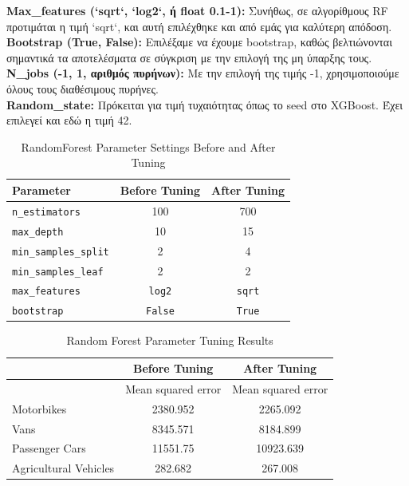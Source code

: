 \documentclass{llncs}
\begin{document}
\noindent \textbf{Max\_features (`sqrt`, `log2`, ή float 0.1-1):}
Συνήθως, σε αλγορίθμους RF προτιμάται η τιμή `sqrt`, και αυτή επιλέχθηκε και από εμάς για καλύτερη απόδοση. \\

\noindent \textbf{Bootstrap (True, False):}
Επιλέξαμε να έχουμε bootstrap, καθώς βελτιώνονται σημαντικά τα αποτελέσματα σε σύγκριση με την επιλογή της μη ύπαρξης τους.\\

\noindent \textbf{N\_jobs (-1, 1, αριθμός πυρήνων):}
Με την επιλογή της τιμής -1, χρησιμοποιούμε όλους τους διαθέσιμους πυρήνες.\\

\noindent \textbf{Random\_state:}
Πρόκειται για τιμή τυχαιότητας όπως το seed στο XGBoost. Έχει επιλεγεί και εδώ η τιμή 42.\\

\begin{table}[h!]
    \centering
    \begin{tabular}{l|cc}
        \hline
        Parameter & Before Tuning & After Tuning \\
        \hline
        \texttt{n\_estimators} & 100 & 700 \\
        \texttt{max\_depth} & 10 & 15 \\
        \texttt{min\_samples\_split} & 2 & 4 \\
        \texttt{min\_samples\_leaf} & 2 & 2 \\
        \texttt{max\_features} & \texttt{log2} & \texttt{sqrt} \\
        \texttt{bootstrap} & \texttt{False} & \texttt{True} \\
        \hline
    \end{tabular}
    \caption{RandomForest Parameter Settings Before and After Tuning}
\end{table}

\begin{table}[h!]
    \centering
    \begin{tabular}{lcc}
        \hline
        & \multicolumn{1}{c}{Before Tuning} & \multicolumn{1}{c}{After Tuning} \\
        \hline
        & Mean squared error & Mean squared error \\
        \hline
        Motorbikes & 2380.952 & 2265.092 \\
        Vans & 8345.571 &  8184.899 \\
        Passenger Cars & 11551.75  & 10923.639 \\
        Agricultural Vehicles & 282.682  & 267.008 \\
        \hline
    \end{tabular}
    \caption{Random Forest Parameter Tuning Results}
\end{table}
\end{document}
